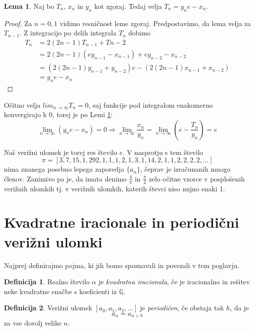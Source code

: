 \documentclass[a4paper,12pt]{article}
\newcommand{\Q}{\mathbb{Q}}
\theoremstyle{definition}
\newtheorem{df}{Definicija}[section]
\theoremstyle{proposition}
\theoremstyle{theorem}
\theoremstyle{lemma}
\newtheorem{lem}{Lema}[section]
\begin{document}
\begin{lem}
\label{rekurzija}
Naj bo $T_n$, $x_n$ in $y_n$ kot zgoraj. Tedaj velja $T_n=y_n e-x_n$.
\end{lem}
\begin{proof}
Za $n=0,1$ vidimo resničnost leme zgoraj. Predpostavimo, da lema velja za $T_{n-1}$. Z integracijo po delih integrala $T_n$ dobimo 
\begin{equation*}
\begin{split}
T_n &= 2(2n-1)T_{n-1}+T{n-2} \\
&=2(2n-1)(e y_{n-1} -x_{n-1}) + e y_{n-2} -x_{n-2} \\
&=(2(2n-1)y_{n-1}+y_{n-2})e - (2(2n-1)x_{n-1}+x_{n-2}) \\
&=y_n e - x_n
\end{split}
\end{equation*}
\end{proof}

Očitno velja $lim_{n\to\infty}T_n =0$, saj funkcije pod integralom enakomerno konvergirajo k 0, torej je po Lemi \ref{rekurzija}:
\[ \lim_{n\to\infty}(y_ne-x_n) = 0 \Rightarrow \lim_{n\to\infty}\frac{x_n}{y_n}=\lim_{n\to\infty}(e-\frac{T_n}{y_n}) =e \]

Naš verižni ulomek je torej res število $e$. V nasprotju s tem število
$$\pi=[3, 7, 15, 1, 292, 1, 1, 1, 2, 1, 3, 1, 14, 2, 1, 1, 2, 2, 2, 2, ...]$$
nima znanega posebno lepega zaporedja $\{a_n\}$, čeprav je izračunanih mnogo členov. Zanimivo pa je, da imata denimo $\frac{4}{\pi}$ in $\frac{\pi}{2}$ zelo očitne vzorce v posplošenih verižnih ulomkih tj. v verižnih ulomkih, katerih števci niso nujno enaki 1.

\section{Kvadratne iracionale in periodični verižni ulomki} \label{periode}

Najprej definirajmo pojma, ki jih bomo spoznavali in povezali v tem poglavju.

\begin{df}
Realno število $\alpha$ je \textit{kvadratna iracionala}, če je iracionalno in rešitev neke kvadratne enačbe s koeficienti iz $\Q$.
\end{df}
\begin{df}
Verižni ulomek $[a_0, a_1, a_2, ...]$ je \textit{periodičen}, če obstaja tak $h$, da je $$a_n=a_{n+h}$$ za vse dovolj velike $n$.
\end{df}
\end{document}
